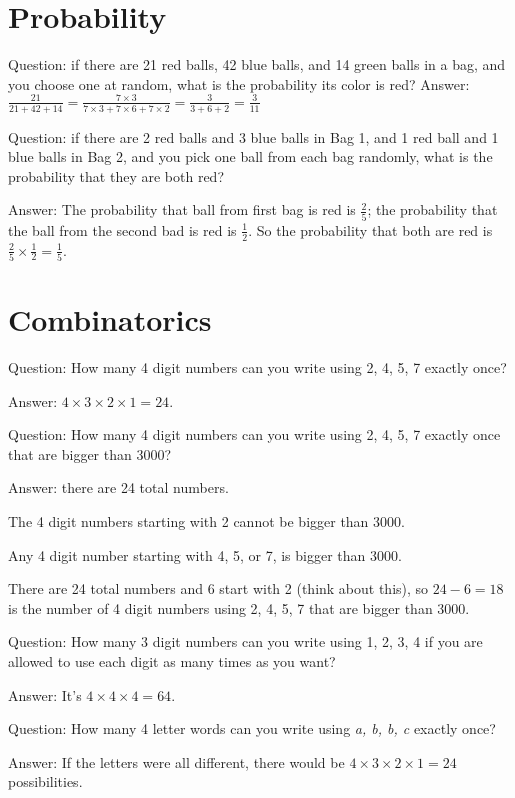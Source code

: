\documentclass[fullpage,twocolumn]{article}
\newcommand{\vp}{{\vspace{0.1in}}}
\begin{document}
\section{Probability}

Question: if there are 21 red balls, 42 blue balls, and 14 green balls 
in a bag, and you choose one at random, what is 
the probability its color is red?
\vp
Answer: $\frac{21}{21+42+14} = \frac{7\times3}{7\times 3 + 7 \times 6 + 7 \times 2} = \frac{3}{3+6+2} = \frac{3}{11}$


Question: if there are 2 red balls and 3 blue balls in Bag 1, and 1 red ball and 1 blue balls in Bag 2, and
you pick one ball from each bag randomly, what is the probability that they are both red?

\vp
Answer: The probability that ball from first bag is red is $\frac{2}{5}$; the probability that
the ball from the second bad is red is $\frac{1}{2}$. So the probability that both are red
is $\frac{2}{5}\times \frac{1}{2} = \frac{1}{5}$.

\section{Combinatorics}

Question: How many 4 digit numbers can you write using 2, 4, 5, 7 exactly once?

\vp
Answer: $4 \times 3 \times 2 \times 1 = 24$.

Question: How many 4 digit numbers can you write using 2, 4, 5, 7 exactly once that are bigger than 3000?

\vp
Answer: there are 24 total numbers. 

The 4 digit numbers starting with 2 cannot be bigger than 3000.

Any 4 digit number starting with 4, 5, or 7, is bigger than 3000.

There are 24 total numbers and 6 start with 2 (think about this), so $24-6=18$ is
the number of 4 digit numbers using 2, 4, 5, 7 that are bigger than 3000.

Question: How many 3 digit numbers can you write using 1, 2, 3, 4 if you are
allowed to use each digit as many times as you want?

\vp
Answer: It's $4 \times 4 \times 4 = 64$.

Question: How many 4 letter words can you write using {\em a, b, b, c} exactly once?

\vp
Answer: If the letters were all different, there would be $4 \times 3 \times 2
\times 1 = 24$ possibilities. 
\end{document}
